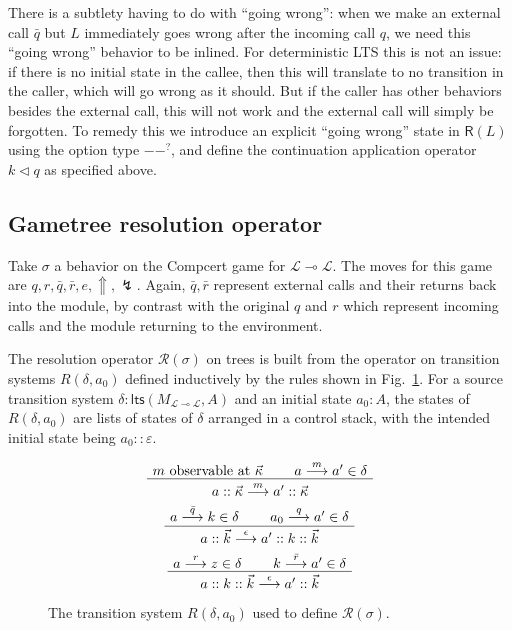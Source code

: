 \documentclass[11pt]{article}
\newcommand{\kw}[1]{{\mathsf{#1}}}
\begin{document}
There is a subtlety having to do with ``going wrong'':
when we make an external call $\bar{q}$
but $L$ immediately goes wrong after the incoming call $q$,
we need this ``going wrong'' behavior to be inlined.
For deterministic LTS this is not an issue:
if there is no initial state in the callee,
then this will translate to no transition in the caller,
which will go wrong as it should.
But if the caller has other behaviors
besides the external call,
this will not work and the external call will simply be
forgotten.
To remedy this we introduce an explicit ``going wrong''
state in $\kw{R}(L)$ using the option type $--^?$,
and define the continuation application operator $k \lhd q$
as specified above.

\subsection{Gametree resolution operator}
\label{sec:res}

Take $\sigma$ a behavior on the Compcert game for
$\mathcal{L} \multimap \mathcal{L}$.
The moves for this game are $q, r, \bar{q}, \bar{r}, e, \Uparrow, \lightning$.
Again, $\bar{q}, \bar{r}$ represent external calls and their returns
back into the module,
by contrast with the original $q$ and $r$ which represent
incoming calls and the module returning to the environment.

The resolution operator $\mathcal{R}(\sigma)$ on trees is built from
the operator on transition systems $R(\delta, a_0)$
defined inductively by the rules shown in Fig.~\ref{fig:res}.
For a source transition system
$\delta : \kw{lts}(M_{\mathcal{L} \multimap \mathcal{L}}, A)$
and an initial state $a_0 : A$,
the states of $R(\delta, a_0)$ are lists of states of $\delta$ arranged in a control stack,
with the intended initial state being $a_0 :: \varepsilon$.

\begin{figure}
\[
  \AxiomC{$m \mbox{ observable at } \vec{\kappa}$}
  \AxiomC{$a \stackrel{m}{\longrightarrow} a' \in \delta$}
  \BinaryInfC{$a :: \vec{\kappa} \stackrel{m}{\longrightarrow} a' :: \vec{\kappa}$}
  \DisplayProof
\]
\vspace{.5em}
\[
  \AxiomC{$a \stackrel{\bar{q}}{\longrightarrow} k \in \delta$}
  \AxiomC{$a_0 \stackrel{q}{\longrightarrow} a' \in \delta$}
  \BinaryInfC{$a :: \vec{k} \stackrel{\epsilon}{\longrightarrow} a' :: k :: \vec{k}$}
  \DisplayProof
\]
\vspace{.5em}
\[
  \AxiomC{$a \stackrel{r}{\longrightarrow} z \in \delta$}
  \AxiomC{$k \stackrel{\bar{r}}{\longrightarrow} a' \in \delta$}
  \BinaryInfC{$a :: k :: \vec{k} \stackrel{\epsilon}{\longrightarrow} a' :: \vec{k}$}
  \DisplayProof
\]
\caption{The transition system $R(\delta, a_0)$ used to define $\mathcal{R}(\sigma)$.}
\label{fig:res}
\end{figure}
\end{document}
